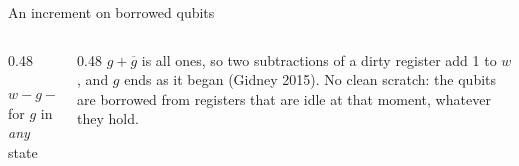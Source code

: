 \documentclass[aspectratio=169,11pt]{beamer}
\newcommand{\code}[2][]{}
\begin{document}
\begin{frame}[fragile]{An increment on borrowed qubits}
  \begin{columns}[c]
    \begin{column}{0.48\textwidth}
      \centering
      \par
      \vskip2mm
      {\small $w-g-\overline g=w+1-2^{|w|}$\\for $g$ in \emph{any} state}
    \end{column}
    \begin{column}{0.48\textwidth}
      \small $g+\overline g$ is all ones, so two subtractions of a dirty register add 1 to $w$, and $g$ ends as it began (Gidney 2015).
      \vskip2mm
      No clean scratch: the qubits are borrowed from registers that are idle at that moment, whatever they hold.
    \end{column}
  \end{columns}
  \vskip2mm
  \code[basicstyle=\ttfamily\scriptsize]{inc_borrowed.py}
\end{frame}
\end{document}
